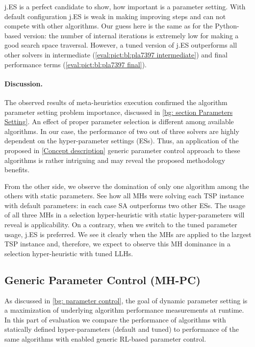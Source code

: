 j.ES is a perfect candidate to show, how important is a parameter setting. With default configuration j.ES is weak in making improving steps and can not compete with other algorithms. Our guess here is the same as for the Python-based version: the number of internal iterations is extremely low for making a good search space traversal. However, a tuned version of j.ES outperforms all other solvers in intermediate (\cref{eval:pict:bl:pla7397 intermediate}) and final performance terms (\cref{eval:pict:bl:pla7397 final}).


\paragraph{Discussion.} The observed results of meta-heuristics execution confirmed the algorithm parameter setting problem importance, discussed in \cref{bg: section Parameters Setting}. An effect of proper parameter selection is different among available algorithms. In our case, the performance of two out of three solvers are highly dependent on the hyper-parameter settings (ESs). Thus, an application of the proposed in \cref{Concept description} generic parameter control approach to these algorithms is rather intriguing and may reveal the proposed methodology benefits.

From the other side, we observe the domination of only one algorithm among the others with static parameters. See how all MHs were solving each TSP instance with default parameters: in each case SA outperforms two other ESs. The usage of all three MHs in a selection hyper-heuristic with static hyper-parameters will reveal is applicability. On a contrary, when we switch to the tuned parameter usage, j.ES is preferred. We see it clearly when the MHs are applied to the largest TSP instance and, therefore, we expect to observe this MH dominance in a selection hyper-heuristic with tuned LLHs.

\subsection{Generic Parameter Control (MH-PC)}\label{eval:1:PC}
As discussed in \cref{bg: parameter control}, the goal of dynamic parameter setting is a maximization of underlying algorithm performance measurements at runtime. In this part of evaluation we compare the performance of algorithms with statically defined hyper-parameters (default and tuned) to performance of the same algorithms with enabled generic RL-based parameter control.

